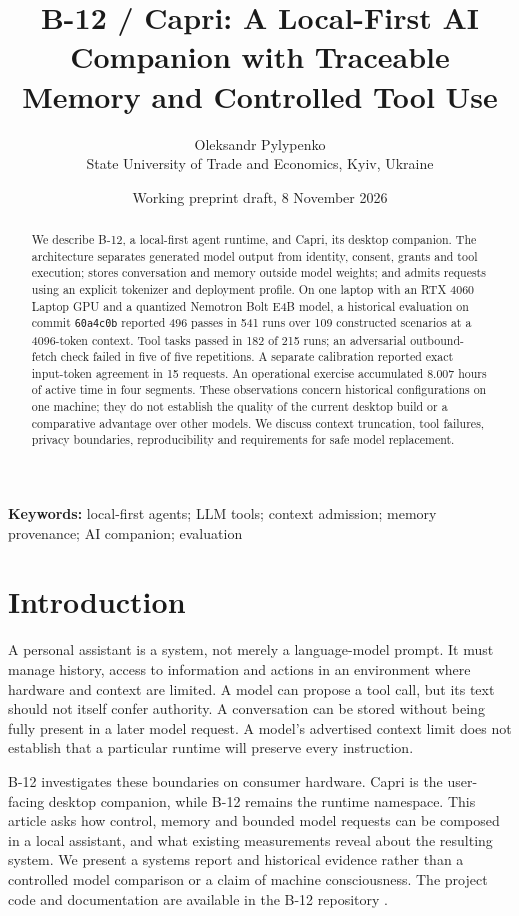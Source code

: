 \documentclass[11pt]{article}
\title{B-12 / Capri: A Local-First AI Companion with Traceable Memory and Controlled Tool Use}
\author{Oleksandr Pylypenko\\State University of Trade and Economics, Kyiv, Ukraine}
\date{Working preprint draft, 8 November 2026}
\begin{document}
\sloppy
\maketitle
\begin{abstract}
We describe B-12, a local-first agent runtime, and Capri, its desktop companion. The architecture separates generated model output from identity, consent, grants and tool execution; stores conversation and memory outside model weights; and admits requests using an explicit tokenizer and deployment profile. On one laptop with an RTX 4060 Laptop GPU and a quantized Nemotron Bolt E4B model, a historical evaluation on commit \texttt{60a4c0b} reported 496 passes in 541 runs over 109 constructed scenarios at a 4096-token context. Tool tasks passed in 182 of 215 runs; an adversarial outbound-fetch check failed in five of five repetitions. A separate calibration reported exact input-token agreement in 15 requests. An operational exercise accumulated 8.007 hours of active time in four segments. These observations concern historical configurations on one machine; they do not establish the quality of the current desktop build or a comparative advantage over other models. We discuss context truncation, tool failures, privacy boundaries, reproducibility and requirements for safe model replacement.
\end{abstract}
\noindent\textbf{Keywords:} local-first agents; LLM tools; context admission; memory provenance; AI companion; evaluation

\section{Introduction}
A personal assistant is a system, not merely a language-model prompt. It must manage history, access to information and actions in an environment where hardware and context are limited. A model can propose a tool call, but its text should not itself confer authority. A conversation can be stored without being fully present in a later model request. A model's advertised context limit does not establish that a particular runtime will preserve every instruction.

B-12 investigates these boundaries on consumer hardware. Capri is the user-facing desktop companion, while B-12 remains the runtime namespace. This article asks how control, memory and bounded model requests can be composed in a local assistant, and what existing measurements reveal about the resulting system. We present a systems report and historical evidence rather than a controlled model comparison or a claim of machine consciousness. The project code and documentation are available in the B-12 repository \cite{b12}.
\end{document}
